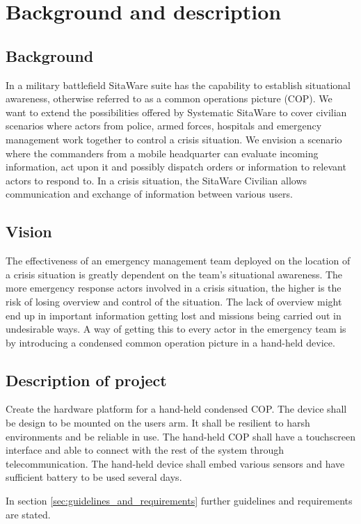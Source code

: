 \chapter{Background and description}
\section{Background}
In a military battlefield SitaWare suite has the capability to establish situational awareness, otherwise referred to as a common operations picture (COP). We want to extend the possibilities offered by Systematic SitaWare to cover civilian scenarios where
actors from police, armed forces, hospitals and emergency management work together to
control a crisis situation. We envision a scenario where the commanders from a mobile
headquarter can evaluate incoming information, act upon it and possibly dispatch orders
or information to relevant actors to respond to.
In a crisis situation, the SitaWare Civilian allows communication and exchange of information between various users. 

\section{Vision}
The effectiveness of an emergency management team deployed on the location of a crisis
situation is greatly dependent on the team’s situational awareness. The more emergency
response actors involved in a crisis situation, the higher is the risk of losing overview and
control of the situation. The lack of overview might end up in important information
getting lost and missions being carried out in undesirable ways.
A way of getting this to every actor in the emergency team is by introducing a condensed common operation picture in a hand-held device. 

\section{Description of project}
Create the hardware platform for a hand-held condensed COP. The device shall be design to be mounted on the users arm. It shall be resilient to harsh environments and be reliable in use. The hand-held COP shall have a touchscreen interface and able to connect with the rest of the system through telecommunication.
The hand-held device shall embed various sensors and have sufficient battery to be used several days. 

In section \ref{sec:guidelines_and_requirements} further guidelines and requirements are stated. 

